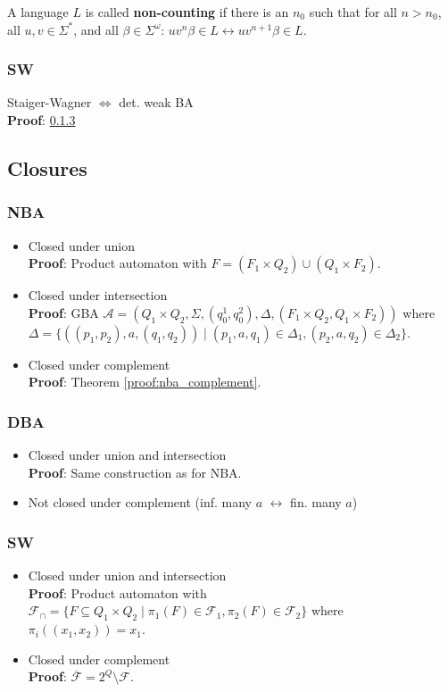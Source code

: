 \documentclass{article}
\begin{document}
A language $L$ is called \textbf{non-counting} if there is an $n_0$ such that for all $n > n_0$, all $u, v \in \Sigma^*$, and all $\beta \in \Sigma^\omega$: $uv^n\beta \in L \leftrightarrow uv^{n+1}\beta \in L$.

\subsubsection{SW}
Staiger-Wagner $\Leftrightarrow$ det. weak BA \\
\textbf{Proof}: \ref{} %

\subsection{Closures}
\subsubsection{NBA}
\begin{itemize}
	\item Closed under union \\
    	\textbf{Proof}: Product automaton with $F = (F_1 \times Q_2) \cup (Q_1 \times F_2)$.
    \item Closed under intersection \\
    	\textbf{Proof}: GBA $\mathcal{A} = (Q_1 \times Q_2, \Sigma, (q_0^1, q_0^2), \Delta, (F_1 \times Q_2, Q_1 \times F_2))$ where \\
    	$\Delta = \{ ((p_1, p_2), a, (q_1, q_2)) \mid (p_1, a, q_1) \in \Delta_1, (p_2, a, q_2) \in \Delta_2 \}$.
    \item Closed under complement \\
    	\textbf{Proof}: Theorem \ref{proof:nba_complement}.
\end{itemize}

\subsubsection{DBA}
\begin{itemize}
	\item Closed under union and intersection \\
		\textbf{Proof}: Same construction as for NBA.
	\item Not closed under complement (inf. many $a$ $\leftrightarrow$ fin. many $a$)
\end{itemize}

\subsubsection{SW}
\begin{itemize}
	\item Closed under union and intersection \\
    	\textbf{Proof}: Product automaton with $\mathcal{F}_\cap = \{ F \subseteq Q_1 \times Q_2 \mid \pi_1(F) \in \mathcal{F}_1, \pi_2(F) \in \mathcal{F}_2 \}$ where $\pi_i((x_1, x_2)) = x_1$. 
    \item Closed under complement \\
    	\textbf{Proof}: $\overline{\mathcal{F}} = 2^Q \setminus \mathcal{F}$.
\end{itemize}
\end{document}
